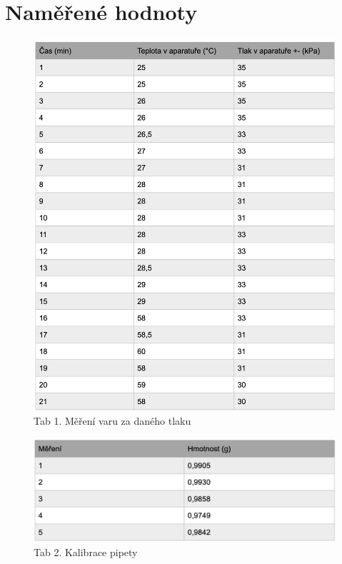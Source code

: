 \documentclass[13pt, a4paper, twoside]{article}
\begin{document}
\section*{Naměřené hodnoty}

\begin{figure}[H]
    \centering
    \includegraphics[width=6in]{uloha_9_tab_1.png}
    \caption*{Tab 1. Měření varu za daného tlaku}
\end{figure}


\begin{figure}[H]
    \centering
    \includegraphics[width=6in]{uloha_9_tab_2.png}
    \caption*{Tab 2. Kalibrace pipety}
\end{figure}
\end{document}

